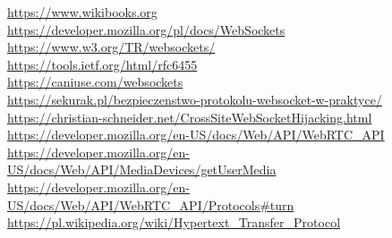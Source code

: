 \documentclass{article}
\begin{document}
\url{https://www.wikibooks.org}\\
\url{https://developer.mozilla.org/pl/docs/WebSockets}\\
\url{https://www.w3.org/TR/websockets/}\\
\url{https://tools.ietf.org/html/rfc6455}\\
\url{https://caniuse.com/websockets}\\
\url{https://sekurak.pl/bezpieczenstwo-protokolu-websocket-w-praktyce/}\\
\url{https://christian-schneider.net/CrossSiteWebSocketHijacking.html}\\
\url{https://developer.mozilla.org/en-US/docs/Web/API/WebRTC_API}\\
\url{https://developer.mozilla.org/en-US/docs/Web/API/MediaDevices/getUserMedia}\\
\url{https://developer.mozilla.org/en-US/docs/Web/API/WebRTC_API/Protocols#turn}\\
\url{https://pl.wikipedia.org/wiki/Hypertext_Transfer_Protocol}
\end{document}
